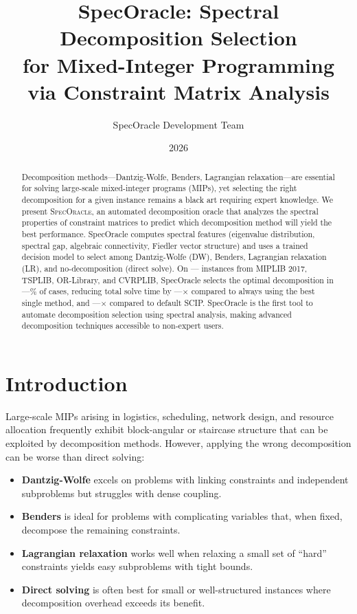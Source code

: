 \documentclass[11pt]{article}
\title{SpecOracle: Spectral Decomposition Selection\\for Mixed-Integer Programming via Constraint Matrix Analysis}
\author{SpecOracle Development Team}
\date{2026}
\begin{document}
\maketitle

\begin{abstract}
Decomposition methods---Dantzig-Wolfe, Benders, Lagrangian relaxation---are essential for solving large-scale mixed-integer programs (MIPs), yet selecting the right decomposition for a given instance remains a black art requiring expert knowledge. We present \textsc{SpecOracle}, an automated decomposition oracle that analyzes the spectral properties of constraint matrices to predict which decomposition method will yield the best performance. SpecOracle computes spectral features (eigenvalue distribution, spectral gap, algebraic connectivity, Fiedler vector structure) and uses a trained decision model to select among Dantzig-Wolfe (DW), Benders, Lagrangian relaxation (LR), and no-decomposition (direct solve). On --- instances from MIPLIB 2017, TSPLIB, OR-Library, and CVRPLIB, SpecOracle selects the optimal decomposition in ---\% of cases, reducing total solve time by ---$\times$ compared to always using the best single method, and ---$\times$ compared to default SCIP. SpecOracle is the first tool to automate decomposition selection using spectral analysis, making advanced decomposition techniques accessible to non-expert users.
\end{abstract}

\section{Introduction}
\label{sec:intro}

Large-scale MIPs arising in logistics, scheduling, network design, and resource allocation frequently exhibit block-angular or staircase structure that can be exploited by decomposition methods. However, applying the wrong decomposition can be worse than direct solving:

\begin{itemize}[leftmargin=*]
\item \textbf{Dantzig-Wolfe} excels on problems with linking constraints and independent subproblems but struggles with dense coupling.
\item \textbf{Benders} is ideal for problems with complicating variables that, when fixed, decompose the remaining constraints.
\item \textbf{Lagrangian relaxation} works well when relaxing a small set of ``hard'' constraints yields easy subproblems with tight bounds.
\item \textbf{Direct solving} is often best for small or well-structured instances where decomposition overhead exceeds its benefit.
\end{itemize}
\end{document}
